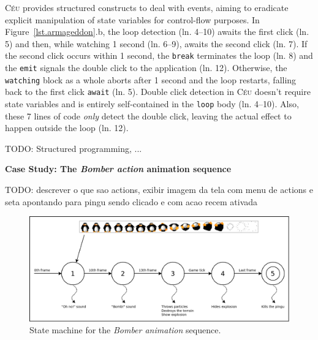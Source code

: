 \documentclass{vgtc}                          %
\newcommand{\CEU}{\textsc{C\'{e}u}\xspace}
\newcommand{\code}[1] {{\small{\texttt{#1}}}}
\begin{document}
\CEU provides structured constructs to deal with events, aiming to eradicate
explicit manipulation of state variables for control-flow purposes.
%
In Figure~\ref{lst.armageddon}.b, the loop detection (ln. 4--10) awaits the
first click (ln. 5) and then, while watching 1 second (ln. 6--9), awaits the
second click (ln. 7).
If the second click occurs within 1 second, the \code{break} terminates the
loop (ln. 8) and the \code{emit} signals the double click to the application
(ln. 12).
Otherwise, the \code{watching} block as a whole aborts after 1 second  and the
loop restarts, falling back to the first click \code{await} (ln. 5).
%
Double click detection in \CEU doesn't require state variables and is entirely
self-contained in the \code{loop} body (ln. 4--10).
Also, these 7 lines of code \emph{only} detect the double click, leaving the
actual effect to happen outside the loop (ln. 12).

TODO: Structured programming, ...

\textbf{Case Study: The \emph{Bomber action} animation sequence}

TODO: descrever o que sao actions, exibir imagem da tela com menu de actions e
seta apontando para pingu sendo clicado e com acao recem ativada


\begin{figure}[t]
\centering
\includegraphics[width=\columnwidth]{bomber-state}
\caption{ State machine for the \emph{Bomber animation} sequence.
\label{fig.bomber}
}
\end{figure}
\end{document}
